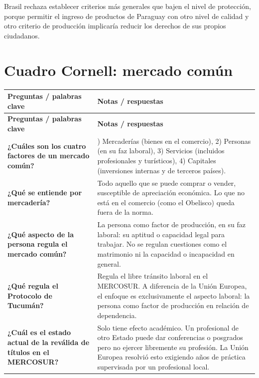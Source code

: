 \documentclass[12pt,oneside]{book}
\begin{document}
Brasil rechaza establecer criterios más generales que bajen el nivel de protección, porque permitir el ingreso de productos de Paraguay con otro nivel de calidad y otro criterio de producción implicaría reducir los derechos de sus propios ciudadanos.

\section{Cuadro Cornell: mercado común}

\begin{longtable}{>{\raggedright\arraybackslash}p{} >{\raggedright\arraybackslash}p{}}
\toprule
\textbf{Preguntas / palabras clave} & \textbf{Notas / respuestas} \\
\midrule
\endfirsthead
\toprule
\textbf{Preguntas / palabras clave} & \textbf{Notas / respuestas} \\
\midrule
\endhead
\bottomrule
\endfoot

\textbf{¿Cuáles son los cuatro factores de un mercado común?} &
1) Mercaderías (bienes en el comercio), 2) Personas (en su faz laboral), 3) Servicios (incluidos profesionales y turísticos), 4) Capitales (inversiones internas y de terceros países). \\[0.8em]

\textbf{¿Qué se entiende por mercadería?} &
Todo aquello que se puede comprar o vender, susceptible de apreciación económica. Lo que no está en el comercio (como el Obelisco) queda fuera de la norma. \\[0.8em]

\textbf{¿Qué aspecto de la persona regula el mercado común?} &
La persona como factor de producción, en su faz laboral: su aptitud o capacidad legal para trabajar. No se regulan cuestiones como el matrimonio ni la capacidad o incapacidad en general. \\[0.8em]

\textbf{¿Qué regula el Protocolo de Tucumán?} &
Regula el libre tránsito laboral en el MERCOSUR. A diferencia de la Unión Europea, el enfoque es exclusivamente el aspecto laboral: la persona como factor de producción en relación de dependencia. \\[0.8em]

\textbf{¿Cuál es el estado actual de la reválida de títulos en el MERCOSUR?} &
Solo tiene efecto académico. Un profesional de otro Estado puede dar conferencias o posgrados pero no ejercer libremente su profesión. La Unión Europea resolvió esto exigiendo años de práctica supervisada por un profesional local. \\[0.8em]


\end{longtable}
\end{document}
